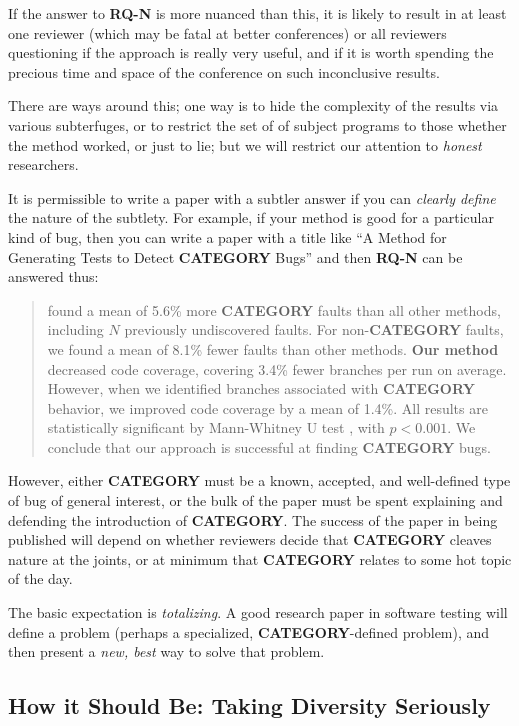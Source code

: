 \documentclass[sigplan]{acmart}
\begin{document}
If the answer to {\bf RQ-N} is more nuanced than this, it is likely to result in
at least one reviewer (which may be fatal at better conferences) or
all reviewers questioning if the approach is really very useful, and
if it is worth spending the precious time and space of the conference
on such inconclusive results.

There are ways around this; one way is to hide the complexity of the
results via various subterfuges, or to restrict the set of of subject
programs to those whether the method worked, or just to lie; but we
will restrict our attention to \emph{honest} researchers.

It is permissible to write a paper with a subtler answer if you can
\emph{clearly define} the nature of the subtlety.  For example, if
your method is good for a particular kind of bug, then you can write a
paper with a title like ``A Method for Generating Tests to Detect {\bf
  CATEGORY} Bugs'' and then {\bf RQ-N} can be answered thus:


\begin{quote}
 found a mean of 5.6\% more {\bf CATEGORY} faults than all
other methods, including $N$ previously undiscovered faults.  For
non-{\bf CATEGORY} faults, we found a mean of 8.1\% fewer faults than
other methods. {\bf Our
  method} decreased code coverage, covering 3.4\% fewer branches
per run on average.  However, when we identified branches associated
with {\bf CATEGORY} behavior, we improved code coverage by a mean of
1.4\%.  All results are statistically significant by
Mann-Whitney U test \cite{arcuri2014hitchhiker}, with $p < 0.001$.  We
conclude that our approach is successful at finding {\bf CATEGORY} bugs.
\end{quote}

However, either {\bf CATEGORY} must be a known, accepted, and
well-defined type of bug of general interest, or the bulk of the paper
must be spent explaining and defending the introduction of {\bf
  CATEGORY}.  The success of the paper in being published will depend
on whether reviewers decide that {\bf CATEGORY} cleaves nature at the
joints, or at minimum that {\bf CATEGORY} relates to some hot topic of
the day.

The basic expectation is \emph{totalizing}.  A good research paper in
software testing will define a problem (perhaps a specialized, {\bf
  CATEGORY}-defined problem), and then present a \emph{new, best} way
to solve that problem.

\subsection{How it Should Be: Taking Diversity Seriously}
\end{document}
